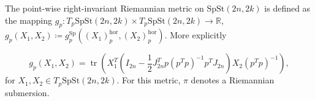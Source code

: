 The point-wise right-invariant Riemannian metric on $\mathrm{SpSt}(2n, 2k)$ is defined as the mapping $g_{p}:T_{p}\mathrm{SpSt}(2n, 2k)\times T_{p}\mathrm{SpSt}(2n, 2k)\xrightarrow{}\mathbb{R}$, $g_{p}(X_{1},X_{2})\coloneqq g^{\mathrm{Sp}}_{p}((X_{1})^{\mathrm{hor}}_{p},(X_{2})^{\mathrm{hor}}_{p})$. More explicitly


\begin{equation}\label{eq:spst_metric}
    g_{p}(X_{1},X_{2})=\operatorname{tr}\left(X_{1}^{T}\left(I_{2n}- \frac{1}{2}J_{2n}^{T}p(p^{T}p)^{-1}p^{T}J_{2n}\right)X_{2}(p^{T}p)^{-1}\right),
\end{equation}
for $X_{1},X_{2}\in T_{p}\mathrm{SpSt}(2n, 2k)$. For this metric, $\pi$ denotes a Riemannian submersion.

